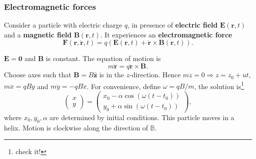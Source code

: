 \subsubsection*{Electromagnetic forces}
\begin{law}
    Consider a particle with electric charge $q$, in presence of \textbf{electric field} $ \mathbf{E}(\mathbf{r},t) $ and a \textbf{magnetic field} $ \mathbf{B}(\mathbf{r},t) $. It experiences an \textbf{electromagnetic force}
    \[
        \mathbf{F}(\mathbf{r},\dot{\mathbf{r}},t) = q(\mathbf{E}(\mathbf{r},t)+\dot{\mathbf{r}}\times \mathbf{B}(\mathbf{r},t)).
    \]
\end{law}
\begin{example}
    $ \mathbf{E} = \mathbf{0} $ and $ \mathbf{B} $ is constant. The equation of motion is 
    \[
        m \ddot{\mathbf{r}} = q \dot{\mathbf{r}} \times \mathbf{B}.
    \]
    Choose axes such that $\mathbf{B} = B \hat{\mathbf{z}}$ is in the $z$-direction. Hence $m\ddot{z}=0 \Rightarrow z=z_0+ut$, $ m \ddot{x}=qB \dot{y} $ and $ m \ddot{y}=-qB \dot{x} $. For convenience, define $ \omega = qB/m $, the solution is\footnote{check it!}
    \[
        \begin{pmatrix}
            x \\ y
        \end{pmatrix}=
        \begin{pmatrix}
            x_0-\alpha \cos (\omega(t-t_0)) \\ y_0+\alpha \sin (\omega(t-t_0))
        \end{pmatrix},
    \] 
    where $x_0,y_0,\alpha$ are determined by initial conditions. This particle moves in a helix. Motion is clockwise along the direction of $ \mathbb{B} $.
    \begin{center}
    \end{center}
\end{example}